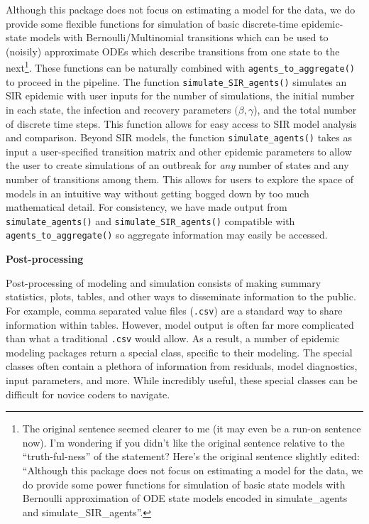 \documentclass[
  shortnames]{jss}
\begin{document}
Although this package does not focus on estimating a model for the data,
we do provide some flexible functions for simulation of basic
discrete-time epidemic-state models with Bernoulli/Multinomial
transitions which can be used to (noisily) approximate ODEs which
describe transitions from one state to the next\footnote{The original
  sentence seemed clearer to me (it may even be a run-on sentence now).
  I'm wondering if you didn't like the original sentence relative to the
  ``truth-ful-ness'' of the statement? Here's the original sentence
  slightly edited: ``Although this package does not focus on estimating
  a model for the data, we do provide some power functions for
  simulation of basic state models with Bernoulli approximation of ODE
  state models encoded in simulate\_agents and simulate\_SIR\_agents''.}.
These functions can be naturally combined with
\texttt{agents\_to\_aggregate()} to proceed in the pipeline. The
function \texttt{simulate\_SIR\_agents()} simulates an SIR epidemic with
user inputs for the number of simulations, the initial number in each
state, the infection and recovery parameters \((\beta, \gamma\)), and
the total number of discrete time steps. This function allows for easy
access to SIR model analysis and comparison. Beyond SIR models, the
function \texttt{simulate\_agents()} takes as input a user-specified
transition matrix and other epidemic parameters to allow the user to
create simulations of an outbreak for \textit{any} number of states and
any number of transitions among them. This allows for users to explore
the space of models in an intuitive way without getting bogged down by
too much mathematical detail. For consistency, we have made output from
\texttt{simulate\_agents()} and \texttt{simulate\_SIR\_agents()}
compatible with \texttt{agents\_to\_aggregate()} so aggregate
information may easily be accessed.

\textbf{Post-processing}

Post-processing of modeling and simulation consists of making summary
statistics, plots, tables, and other ways to disseminate information to
the public. For example, comma separated value files (\texttt{.csv}) are
a standard way to share information within tables. However, model output
is often far more complicated than what a traditional \texttt{.csv}
would allow. As a result, a number of epidemic modeling packages return
a special class, specific to their modeling. The special classes often
contain a plethora of information from residuals, model diagnostics,
input parameters, and more. While incredibly useful, these special
classes can be difficult for novice coders to navigate.
\end{document}
